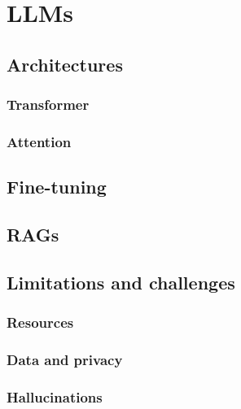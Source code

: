 \documentclass[12pt,a4paper,openright,twoside]{book}
\begin{document}

\chapter{\Aclp{LLM}}\label{ch:llm}

\section{Architectures}\label{sec:llm-architectures}

\subsection{Transformer}\label{subsec:transformer}

\subsection{Attention}\label{subsec:attention}

\section{Fine-tuning}\label{sec:llm-fine-tuning}

\section{\Acp{RAG}}\label{sec:rag}

\section{Limitations and challenges}\label{sec:limitations-and-challenges}

\subsection{Resources}\label{subsec:resources}

\subsection{Data and privacy}\label{subsec:data-and-privacy}

\subsection{Hallucinations}\label{subsec:hallucinations}
\end{document}
